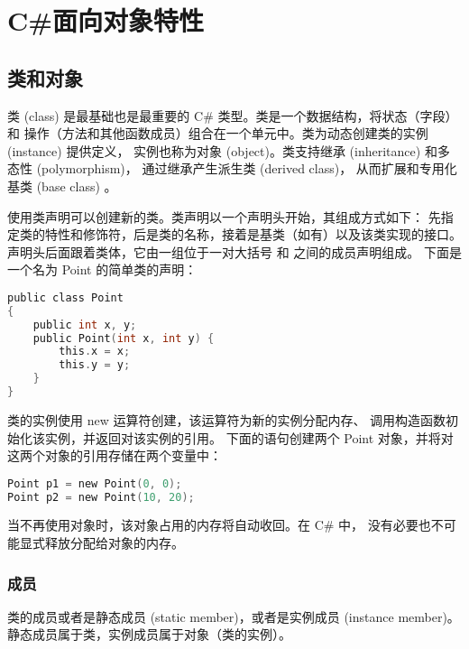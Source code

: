 ﻿%

\chapter{C\#面向对象特性}

\section{类和对象}
类 (class) 是最基础也是最重要的 C\# 类型。类是一个数据结构，将状态（字段）和
操作（方法和其他函数成员）组合在一个单元中。类为动态创建类的实例 (instance) 提供定义，
实例也称为对象 (object)。类支持继承 (inheritance) 和多态性 (polymorphism)，
通过继承产生派生类 (derived class)， 从而扩展和专用化基类 (base class) 。

使用类声明可以创建新的类。类声明以一个声明头开始，其组成方式如下：
先指定类的特性和修饰符，后是类的名称，接着是基类（如有）以及该类实现的接口。
声明头后面跟着类体，它由一组位于一对大括号 { 和 } 之间的成员声明组成。
下面是一个名为 Point 的简单类的声明：

 \begin{lstlisting}[language=C]
public class Point
{
    public int x, y;
    public Point(int x, int y) {
        this.x = x;
        this.y = y;
    }
}
\end{lstlisting}

类的实例使用 new 运算符创建，该运算符为新的实例分配内存、
调用构造函数初始化该实例，并返回对该实例的引用。
下面的语句创建两个 Point 对象，并将对这两个对象的引用存储在两个变量中：

 \begin{lstlisting}[language=C]
Point p1 = new Point(0, 0);
Point p2 = new Point(10, 20);
\end{lstlisting}

当不再使用对象时，该对象占用的内存将自动收回。在 C\# 中，
没有必要也不可能显式释放分配给对象的内存。

\subsection{成员}
类的成员或者是静态成员 (static member)，或者是实例成员 (instance member)。
静态成员属于类，实例成员属于对象（类的实例）。

